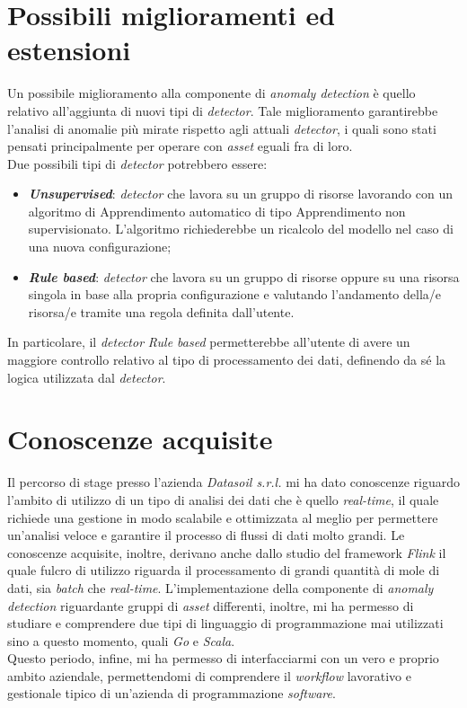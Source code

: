 \section{Possibili miglioramenti ed estensioni}
Un possibile miglioramento alla componente di \textit{anomaly detection} è quello relativo all'aggiunta di nuovi tipi di \textit{detector}. Tale miglioramento garantirebbe l'analisi di anomalie più mirate rispetto agli attuali \textit{detector}, i quali sono stati pensati principalmente per operare con \textit{asset} eguali fra di loro.\\
Due possibili tipi di \textit{detector} potrebbero essere:
\begin{itemize}
	\item{\textbf{\textit{Unsupervised}}: \textit{detector} che lavora su un gruppo di risorse lavorando con un algoritmo di \gls{Apprendimento automatico} di tipo \gls{Apprendimento non supervisionato}. L'algoritmo richiederebbe un ricalcolo del modello nel caso di una nuova configurazione;}
	\item{\textbf{\textit{Rule based}}: \textit{detector} che lavora su un gruppo di risorse oppure su una risorsa singola in base alla propria configurazione e valutando l'andamento della/e risorsa/e tramite una regola definita dall'utente.}
\end{itemize}
In particolare, il \textit{detector} \textit{Rule based} permetterebbe all'utente di avere un maggiore controllo relativo al tipo di processamento dei dati, definendo da sé la logica utilizzata dal \textit{detector}.



\section{Conoscenze acquisite}
Il percorso di stage presso l'azienda \textit{Datasoil s.r.l.} mi ha dato conoscenze riguardo l'ambito di utilizzo di un tipo di analisi dei dati che è quello \textit{real-time}, il quale richiede una gestione in modo scalabile e ottimizzata al meglio per permettere un'analisi veloce e garantire il processo di flussi di dati molto grandi. Le conoscenze acquisite, inoltre, derivano anche dallo studio del \gls{framework} \textit{Flink} il quale fulcro di utilizzo riguarda il processamento di grandi quantità di mole di dati, sia \textit{batch} che \textit{real-time}. L'implementazione della componente di \textit{anomaly detection} riguardante gruppi di \textit{asset} differenti, inoltre, mi ha permesso di studiare e comprendere due tipi di linguaggio di programmazione mai utilizzati sino a questo momento, quali \textit{Go} e \textit{Scala}.\\
Questo periodo, infine, mi ha permesso di interfacciarmi con un vero e proprio ambito aziendale, permettendomi di comprendere il \textit{workflow} lavorativo e gestionale tipico di un'azienda di programmazione \textit{software}.

